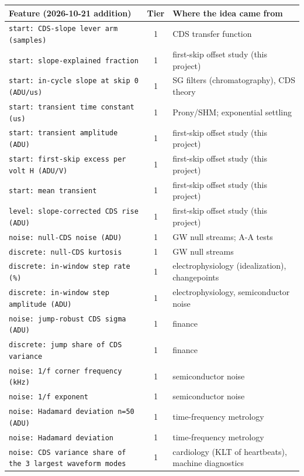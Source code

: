 \documentclass[10pt]{article}
\renewcommand{\_}{\oldunderscore\allowbreak}
\begin{document}
\begin{longtable}{>{\raggedright\arraybackslash}p{}c>{\raggedright\arraybackslash}p{}}
\toprule Feature (2026-10-21 addition) & Tier & Where the idea came from \\ \midrule \endhead
\bottomrule \endfoot
\texttt{start: CDS-slope lever arm (samples)} & 1 & CDS transfer function \\
\texttt{start: slope-explained fraction} & 1 & first-skip offset study (this project) \\
\texttt{start: in-cycle slope at skip 0 (ADU/us)} & 1 & SG filters (chromatography), CDS theory \\
\texttt{start: transient time constant (us)} & 1 & Prony/SHM; exponential settling \\
\texttt{start: transient amplitude (ADU)} & 1 & first-skip offset study (this project) \\
\texttt{start: first-skip excess per volt H (ADU/V)} & 1 & first-skip offset study (this project) \\
\texttt{start: mean transient} & 1 & first-skip offset study (this project) \\
\texttt{level: slope-corrected CDS rise (ADU)} & 1 & first-skip offset study (this project) \\
\texttt{noise: null-CDS noise (ADU)} & 1 & GW null streams; A-A tests \\
\texttt{discrete: null-CDS kurtosis} & 1 & GW null streams \\
\texttt{discrete: in-window step rate (\%)} & 1 & electrophysiology (idealization), changepoints \\
\texttt{discrete: in-window step amplitude (ADU)} & 1 & electrophysiology, semiconductor noise \\
\texttt{noise: jump-robust CDS sigma (ADU)} & 1 & finance \\
\texttt{discrete: jump share of CDS variance} & 1 & finance \\
\texttt{noise: 1/f corner frequency (kHz)} & 1 & semiconductor noise \\
\texttt{noise: 1/f exponent} & 1 & semiconductor noise \\
\texttt{noise: Hadamard deviation n=50 (ADU)} & 1 & time-frequency metrology \\
\texttt{noise: Hadamard deviation} & 1 & time-frequency metrology \\
\texttt{noise: CDS variance share of the 3 largest waveform modes} & 1 & cardiology (KLT of heartbeats), machine diagnostics \\

\end{longtable}
\end{document}
